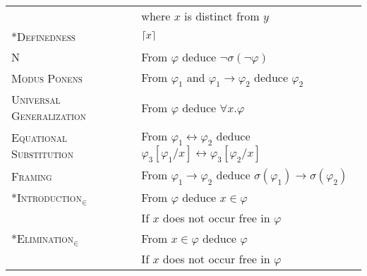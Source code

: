 \documentclass{article}
\newcommand{\imp}{\rightarrow}
\newcommand{\dimp}{\leftrightarrow}
\DeclarePairedDelimiter\ceil{\lceil}{\rceil}
\begin{document}
\begin{longtable}{ll}
  &
     where $x$ is distinct from $y$
  \\
    \textsc{*Definedness}
  &  $\ceil{x}$
  \\
     \textsc{N}
  &  From $\varphi$ deduce $\neg \sigma(\neg \varphi)$
  \\
     \textsc{Modus Ponens}
  &  From $\varphi_1$ and $\varphi_1 \imp \varphi_2$ deduce $\varphi_2$
  \\
     \textsc{Universal Generalization}
  &  From $\varphi$ deduce $\forall x . \varphi$
  \\
     \textsc{Equational Substitution}
  &  From $\varphi_1 \dimp \varphi_2$ deduce $\varphi_3[\varphi_1/x] \dimp 
  \varphi_3[\varphi_2/x]$
  \\
  \textsc{Framing}
  &  From $\varphi_1 \imp \varphi_2$ deduce $\sigma(\varphi_1) \imp 
  \sigma(\varphi_2)$
  \\
     \textsc{*Introduction$_\in$}
  &  From $\varphi$ deduce $x \in \varphi$
  \\
  &
     If $x$ does not occur free in $\varphi$
  \\
     \textsc{*Elimination$_\in$}
  &  From $x \in \varphi$ deduce $\varphi$
  \\
  &
     If $x$ does not occur free in $\varphi$
\end{longtable}
\egroup
\end{document}
